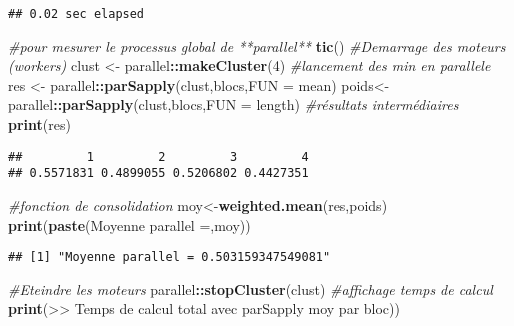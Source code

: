 \documentclass[
]{article}
\newenvironment{Shaded}{\begin{snugshade}}{\end{snugshade}}
\newcommand{\AttributeTok}[1]{\textcolor[rgb]{0.13,0.29,0.53}{#1}}
\newcommand{\CommentTok}[1]{\textcolor[rgb]{0.56,0.35,0.01}{\textit{#1}}}
\newcommand{\DecValTok}[1]{\textcolor[rgb]{0.00,0.00,0.81}{#1}}
\newcommand{\FunctionTok}[1]{\textcolor[rgb]{0.13,0.29,0.53}{\textbf{#1}}}
\newcommand{\NormalTok}[1]{#1}
\newcommand{\OtherTok}[1]{\textcolor[rgb]{0.56,0.35,0.01}{#1}}
\newcommand{\SpecialCharTok}[1]{\textcolor[rgb]{0.81,0.36,0.00}{\textbf{#1}}}
\newcommand{\StringTok}[1]{\textcolor[rgb]{0.31,0.60,0.02}{#1}}
\begin{document}
\begin{verbatim}
## 0.02 sec elapsed
\end{verbatim}

\begin{Shaded}
\begin{Highlighting}[]
\CommentTok{\#pour mesurer le processus global de **parallel**}
\FunctionTok{tic}\NormalTok{()}
\CommentTok{\#Demarrage des moteurs (workers)}
\NormalTok{clust }\OtherTok{\textless{}{-}}\NormalTok{ parallel}\SpecialCharTok{::}\FunctionTok{makeCluster}\NormalTok{(}\DecValTok{4}\NormalTok{)}
\CommentTok{\#lancement des min en parallele}
\NormalTok{res }\OtherTok{\textless{}{-}}\NormalTok{ parallel}\SpecialCharTok{::}\FunctionTok{parSapply}\NormalTok{(clust,blocs,}\AttributeTok{FUN =}\NormalTok{ mean)}
\NormalTok{poids}\OtherTok{\textless{}{-}}\NormalTok{parallel}\SpecialCharTok{::}\FunctionTok{parSapply}\NormalTok{(clust,blocs,}\AttributeTok{FUN =}\NormalTok{ length)}
\CommentTok{\#résultats intermédiaires}
\FunctionTok{print}\NormalTok{(res)}
\end{Highlighting}
\end{Shaded}

\begin{verbatim}
##         1         2         3         4 
## 0.5571831 0.4899055 0.5206802 0.4427351
\end{verbatim}

\begin{Shaded}
\begin{Highlighting}[]
\CommentTok{\#fonction de consolidation}
\NormalTok{moy}\OtherTok{\textless{}{-}}\FunctionTok{weighted.mean}\NormalTok{(res,poids)}
\FunctionTok{print}\NormalTok{(}\FunctionTok{paste}\NormalTok{(}\StringTok{\textquotesingle{}Moyenne parallel =\textquotesingle{}}\NormalTok{,moy))}
\end{Highlighting}
\end{Shaded}

\begin{verbatim}
## [1] "Moyenne parallel = 0.503159347549081"
\end{verbatim}

\begin{Shaded}
\begin{Highlighting}[]
\CommentTok{\#Eteindre les moteurs}
\NormalTok{parallel}\SpecialCharTok{::}\FunctionTok{stopCluster}\NormalTok{(clust)}
\CommentTok{\#affichage temps de calcul}
\FunctionTok{print}\NormalTok{(}\StringTok{\textquotesingle{}\textgreater{}\textgreater{} Temps de calcul total avec parSapply moy par bloc)\textquotesingle{}}\NormalTok{)}
\end{Highlighting}
\end{Shaded}
\end{document}
